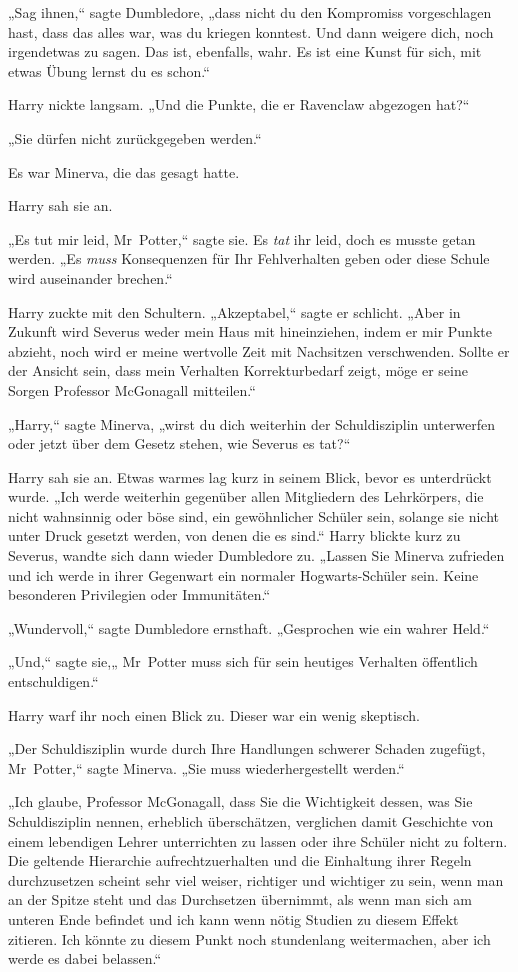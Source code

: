 {„Sag ihnen,“ sagte Dumbledore, „dass nicht du den Kompromiss vorgeschlagen hast, dass das alles war, was du kriegen konntest. Und dann weigere dich, noch irgendetwas zu sagen. Das ist, ebenfalls, wahr. Es ist eine Kunst für sich, mit etwas Übung lernst du es schon.“

Harry nickte langsam. „Und die Punkte, die er Ravenclaw abgezogen hat?“

„Sie dürfen nicht zurückgegeben werden.“

Es war Minerva, die das gesagt hatte.

Harry sah sie an.

„Es tut mir leid, Mr~Potter,“ sagte sie. Es \emph{tat} ihr leid, doch es musste getan werden. „Es \emph{muss} Konsequenzen für Ihr Fehlverhalten geben oder diese Schule wird auseinander brechen.“

Harry zuckte mit den Schultern. „Akzeptabel,“ sagte er schlicht. „Aber in Zukunft wird Severus weder mein Haus mit hineinziehen, indem er mir Punkte abzieht, noch wird er meine wertvolle Zeit mit Nachsitzen verschwenden. Sollte er der Ansicht sein, dass mein Verhalten Korrekturbedarf zeigt, möge er seine Sorgen Professor McGonagall mitteilen.“

„Harry,“ sagte Minerva, „wirst du dich weiterhin der Schuldisziplin unterwerfen oder jetzt über dem Gesetz stehen, wie Severus es tat?“

Harry sah sie an. Etwas warmes lag kurz in seinem Blick, bevor es unterdrückt wurde. „Ich werde weiterhin gegenüber allen Mitgliedern des Lehrkörpers, die nicht wahnsinnig oder böse sind, ein gewöhnlicher Schüler sein, solange sie nicht unter Druck gesetzt werden, von denen die es sind.“ Harry blickte kurz zu Severus, wandte sich dann wieder Dumbledore zu. „Lassen Sie Minerva zufrieden und ich werde in ihrer Gegenwart ein normaler Hogwarts-Schüler sein. Keine besonderen Privilegien oder Immunitäten.“

„Wundervoll,“ sagte Dumbledore ernsthaft. „Gesprochen wie ein wahrer Held.“

„Und,“ sagte sie,„ Mr~Potter muss sich für sein heutiges Verhalten öffentlich entschuldigen.“

Harry warf ihr noch einen Blick zu. Dieser war ein wenig skeptisch.

„Der Schuldisziplin wurde durch Ihre Handlungen schwerer Schaden zugefügt, Mr~Potter,“ sagte Minerva. „Sie muss wiederhergestellt werden.“

„Ich glaube, Professor McGonagall, dass Sie die Wichtigkeit dessen, was Sie Schuldisziplin nennen, erheblich überschätzen, verglichen damit Geschichte von einem lebendigen Lehrer unterrichten zu lassen oder ihre Schüler nicht zu foltern. Die geltende Hierarchie aufrechtzuerhalten und die Einhaltung ihrer Regeln durchzusetzen scheint sehr viel weiser, richtiger und wichtiger zu sein, wenn man an der Spitze steht und das Durchsetzen übernimmt, als wenn man sich am unteren Ende befindet und ich kann wenn nötig Studien zu diesem Effekt zitieren. Ich könnte zu diesem Punkt noch stundenlang weitermachen, aber ich werde es dabei belassen.“

}
